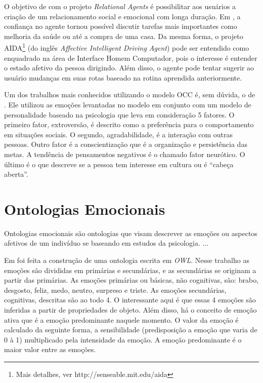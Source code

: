 O objetivo de \citet{bick2003relational} com o projeto \emph{Relational
Agents} é possibilitar aos usuários a criação de um relacionamento social e
emocional com longa duração.  Em \citet{bickmore2009virtual}, a confiança no
agente tornou possível discutir tarefas mais importantes como melhoria da saúde
ou até a compra de uma casa. Da mesma forma, o projeto
AIDA\footnote{Mais detalhes, ver http://senseable.mit.edu/aida} (do
inglês \emph{Affective Intelligent Driving Agent}) pode ser entendido como
enquadrado na área de Interface Homem Computador, pois o interesse é entender o
estado afetivo da pessoa dirigindo. Além disso, o agente pode tentar sugerir
ao usuário mudanças em suas rotas baseado na rotina aprendida anteriormente.

Um dos trabalhos mais conhecidos utilizando o modelo OCC é, sem dúvida, o de
\citet{kshirsagar2002multilayer}. Ele utilizou as emoções levantadas no modelo
em conjunto com um modelo de personalidade baseado na psicologia que leva em
consideração 5 fatores. O primeiro fator, extroversão, é descrito como a
preferência para o comportamento em situações sociais. O segundo,
agradabilidade, é a interação com outras pessoas. Outro fator é a
conscientização que é a organização e persistência das metas. A tendência de
pensamentos negativos é o chamado fator neurótico. O último é o que descreve
se a pessoa tem interesse em cultura ou é ``cabeça aberta''.

\section{Ontologias Emocionais} \label{cap:eda:oe}

Ontologias emocionais são ontologias que visam descrever as emoções ou
aspectos afetivos de um indivíduo se baseando em estudos da psicologia.
...

Em \citet{benta2007ontology} foi feita a construção de uma ontologia escrita
em \emph{OWL}. Nesse trabalho as emoções são divididas em primárias e
secundárias, e as secundárias se originam a partir das primárias. As emoções
primárias ou básicas, não cognitivas, são: brabo, desgosto, feliz, medo,
neutro, surpreso e triste. As emoções secundárias, cognitivas, descritas são
ao todo 4. O interessante aqui é que essas 4 emoções são inferidas a partir
de propriedades de objeto. Além disso, há o conceito de emoção ativa que é a
emoção predominante naquele momento. O valor da emoção é calculado da seguinte
forma, a sensibilidade (predisposição a emoção que varia de 0 à 1)
multiplicado pela intensidade da emoção. A emoção predominante é o maior valor
entre as emoções.

